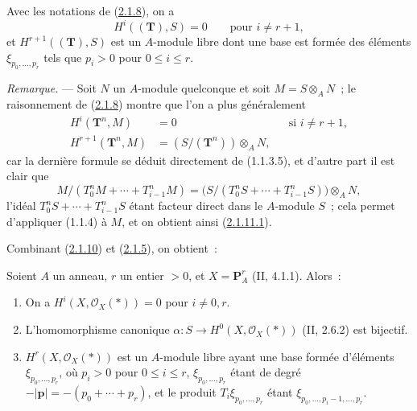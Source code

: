 \begin{corollary}[2.1.10]
\label{III.2.1.10-fr}
Avec les notations de (\hyperref[III.2.1.8-fr]{2.1.8}), on a
\begin{equation}
\label{III.2.1.10.1-fr}
\tag{2.1.10.1}
H^i((\mathbf T),S)=0\qquad\text{pour }i\neq r+1,
\end{equation}
et $H^{r+1}((\mathbf T),S)$ est un $A$-module libre dont une base est formée
des éléments $\xi_{p_0,\ldots,p_r}$ tels que $p_i>0$ pour $0\leq i\leq r$.
\end{corollary}

\begin{env}[2.1.11]
\label{III.2.1.11-fr}
\emph{Remarque.} --- Soit $N$ un $A$-module quelconque et soit
$M=S\otimes_A N$~; le raisonnement de
(\hyperref[III.2.1.8-fr]{2.1.8}) montre que l'on a plus généralement
\begin{align}
\label{III.2.1.11.1-fr}
\tag{2.1.11.1}
H^i(\mathbf T^n,M)&=0 &&\text{si }i\neq r+1,\\
\label{III.2.1.11.2-fr}
\tag{2.1.11.2}
H^{r+1}(\mathbf T^n,M)&=(S/(\mathbf T^n))\otimes_A N,
\end{align}
car la dernière formule se déduit directement de (1.1.3.5), et d'autre
part il est clair que
\[
M/(T_0^nM+\cdots+T_{i-1}^nM)
=\bigl(S/(T_0^nS+\cdots+T_{i-1}^nS)\bigr)\otimes_A N,
\]
l'idéal $T_0^nS+\cdots+T_{i-1}^nS$ étant facteur direct dans le
$A$-module $S$~; cela permet d'appliquer (1.1.4) à $M$, et on obtient ainsi
(\hyperref[III.2.1.11.1-fr]{2.1.11.1}).
\end{env}

Combinant (\hyperref[III.2.1.10-fr]{2.1.10}) et
(\hyperref[III.2.1.5-fr]{2.1.5}), on obtient~:

\begin{proposition}[2.1.12]
\label{III.2.1.12-fr}
Soient $A$ un anneau, $r$ un entier $>0$, et
$X=\mathbf P_A^r$ (II, 4.1.1). Alors~:
\begin{enumerate}
\item[{\rm(i)}] On a $H^i(X,\mathcal O_X(*))=0$ pour $i\neq0,r$.
\item[{\rm(ii)}] L'homomorphisme canonique
$\alpha:S\to H^0(X,\mathcal O_X(*))$ (II, 2.6.2) est bijectif.
\item[{\rm(iii)}] $H^r(X,\mathcal O_X(*))$ est un $A$-module libre ayant
une base formée d'éléments $\xi_{p_0,\ldots,p_r}$, où $p_i>0$ pour
$0\leq i\leq r$, $\xi_{p_0,\ldots,p_r}$ étant de degré
$-|\mathbf p|=-(p_0+\cdots+p_r)$, et le produit
$T_i\xi_{p_0,\ldots,p_r}$ étant
$\xi_{p_0,\ldots,p_i-1,\ldots,p_r}$.
\end{enumerate}
\end{proposition}

